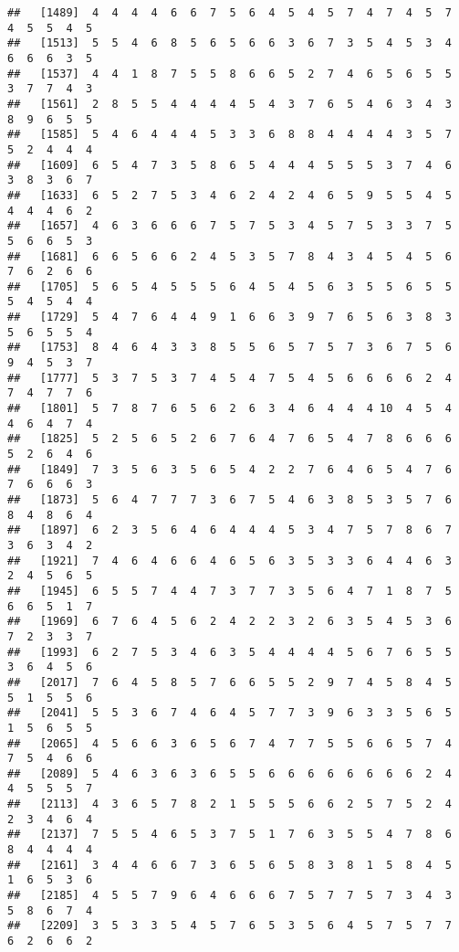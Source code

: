 \documentclass[
]{book}
\begin{document}
\begin{verbatim}
##   [1489]  4  4  4  4  6  6  7  5  6  4  5  4  5  7  4  7  4  5  7  4  5  5  4  5
##   [1513]  5  5  4  6  8  5  6  5  6  6  3  6  7  3  5  4  5  3  4  6  6  6  3  5
##   [1537]  4  4  1  8  7  5  5  8  6  6  5  2  7  4  6  5  6  5  5  3  7  7  4  3
##   [1561]  2  8  5  5  4  4  4  4  5  4  3  7  6  5  4  6  3  4  3  8  9  6  5  5
##   [1585]  5  4  6  4  4  4  5  3  3  6  8  8  4  4  4  4  3  5  7  5  2  4  4  4
##   [1609]  6  5  4  7  3  5  8  6  5  4  4  4  5  5  5  3  7  4  6  3  8  3  6  7
##   [1633]  6  5  2  7  5  3  4  6  2  4  2  4  6  5  9  5  5  4  5  4  4  4  6  2
##   [1657]  4  6  3  6  6  6  7  5  7  5  3  4  5  7  5  3  3  7  5  5  6  6  5  3
##   [1681]  6  6  5  6  6  2  4  5  3  5  7  8  4  3  4  5  4  5  6  7  6  2  6  6
##   [1705]  5  6  5  4  5  5  5  6  4  5  4  5  6  3  5  5  6  5  5  5  4  5  4  4
##   [1729]  5  4  7  6  4  4  9  1  6  6  3  9  7  6  5  6  3  8  3  5  6  5  5  4
##   [1753]  8  4  6  4  3  3  8  5  5  6  5  7  5  7  3  6  7  5  6  9  4  5  3  7
##   [1777]  5  3  7  5  3  7  4  5  4  7  5  4  5  6  6  6  6  2  4  7  4  7  7  6
##   [1801]  5  7  8  7  6  5  6  2  6  3  4  6  4  4  4 10  4  5  4  4  6  4  7  4
##   [1825]  5  2  5  6  5  2  6  7  6  4  7  6  5  4  7  8  6  6  6  5  2  6  4  6
##   [1849]  7  3  5  6  3  5  6  5  4  2  2  7  6  4  6  5  4  7  6  7  6  6  6  3
##   [1873]  5  6  4  7  7  7  3  6  7  5  4  6  3  8  5  3  5  7  6  8  4  8  6  4
##   [1897]  6  2  3  5  6  4  6  4  4  4  5  3  4  7  5  7  8  6  7  3  6  3  4  2
##   [1921]  7  4  6  4  6  6  4  6  5  6  3  5  3  3  6  4  4  6  3  2  4  5  6  5
##   [1945]  6  5  5  7  4  4  7  3  7  7  3  5  6  4  7  1  8  7  5  6  6  5  1  7
##   [1969]  6  7  6  4  5  6  2  4  2  2  3  2  6  3  5  4  5  3  6  7  2  3  3  7
##   [1993]  6  2  7  5  3  4  6  3  5  4  4  4  4  5  6  7  6  5  5  3  6  4  5  6
##   [2017]  7  6  4  5  8  5  7  6  6  5  5  2  9  7  4  5  8  4  5  5  1  5  5  6
##   [2041]  5  5  3  6  7  4  6  4  5  7  7  3  9  6  3  3  5  6  5  1  5  6  5  5
##   [2065]  4  5  6  6  3  6  5  6  7  4  7  7  5  5  6  6  5  7  4  7  5  4  6  6
##   [2089]  5  4  6  3  6  3  6  5  5  6  6  6  6  6  6  6  6  2  4  4  5  5  5  7
##   [2113]  4  3  6  5  7  8  2  1  5  5  5  6  6  2  5  7  5  2  4  2  3  4  6  4
##   [2137]  7  5  5  4  6  5  3  7  5  1  7  6  3  5  5  4  7  8  6  8  4  4  4  4
##   [2161]  3  4  4  6  6  7  3  6  5  6  5  8  3  8  1  5  8  4  5  1  6  5  3  6
##   [2185]  4  5  5  7  9  6  4  6  6  6  7  5  7  7  5  7  3  4  3  5  8  6  7  4
##   [2209]  3  5  3  3  5  4  5  7  6  5  3  5  6  4  5  7  5  7  7  6  2  6  6  2

\end{verbatim}
\end{document}
